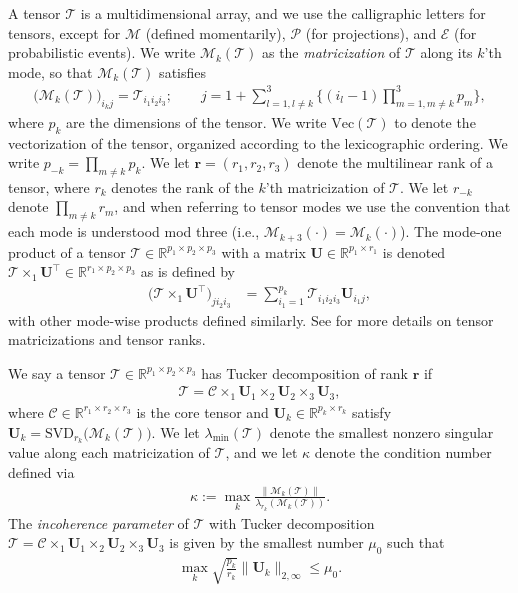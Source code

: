 \documentclass[10pt]{article}
\newcommand{\0}{{\mathbf{0}}}
\newcommand{\1}{{\mathbf{1}}}
\newcommand{\U}{{\mathbf{U}}}
\newcommand{\br}{\boldsymbol{r}}
\renewcommand{\citet}{\cite}
\renewcommand{\t}{^{\top}}
\begin{document}
A tensor $\mathcal{T}$ is a multidimensional array, and we use the calligraphic letters for tensors, except for $\mathcal{M}$ (defined momentarily), $\mathcal{P}$ (for projections), and $\mathcal{E}$ (for probabilistic events).  We write $\mathcal{M}_k(\mathcal{T})$ as the \emph{matricization} of $\mathcal{T}$ along its $k$'th mode, so that $\mathcal{M}_k(\mathcal{T})$ satisfies
\begin{align*}
    \big(\mathcal{M}_k(\mathcal{T}) \big)_{i_kj} = \mathcal{T}_{i_1i_2i_3}; \qquad j = 1 + \sum_{l=1,l\neq k}^{3} \bigg\{ (i_l-1) \prod_{m=1,m\neq k}^3 p_m \bigg\},
\end{align*}
where $p_k$ are the dimensions of the tensor.  We write $\mathrm{Vec}(\mathcal{T})$ to denote the vectorization of the tensor, organized according to the lexicographic ordering.  We write $p_{-k} = \prod_{m\neq k} p_k$.   We let $\br = (r_1,r_2,r_3)$ denote the multilinear rank of a tensor, where $r_k$ denotes the rank of the $k$'th matricization of $\mathcal{T}$.  We let $r_{-k}$ denote $\prod_{m\neq k} r_m$, and when referring to tensor modes we use the convention that each mode is understood mod three (i.e., $\mathcal{M}_{k+3}(\cdot) = \mathcal{M}_k(\cdot)$).  The mode-one  product of a tensor $\mathcal{T}\in\mathbb{R}^{p_1 \times p_2 \times p_3}$ with a matrix $\U\in \mathbb{R}^{p_1 \times r_1}$ is denoted $\mathcal{T} \times_1 \U\t \in \mathbb{R}^{r_1 \times p_2 \times p_3}$ as is defined by
\begin{align*}
    \big( \mathcal{T} \times_1 \U\t \big)_{ji_2i_3} &= \sum_{i_1=1}^{p_k} \mathcal{T}_{i_1i_2i_3} \U_{i_1j},
\end{align*}
with other mode-wise products defined similarly. See \citet{kolda_tensor_2009} for more details on tensor matricizations and tensor ranks.  


We say a tensor $\mathcal{T} \in \mathbb{R}^{p_1 \times p_2 \times p_3}$ has Tucker decomposition of rank  $\br$ if
\begin{align*}
    \mathcal{T} = \mathcal{C} \times_1 \U_1 \times_2 \U_2 \times_3 \U_3,
\end{align*}
where $\mathcal{C}\in \mathbb{R}^{r_1 \times r_2 \times r_3}$ is the core tensor and $\U_k \in \mathbb{R}^{p_k\times r_k}$ satisfy  $\U_k =\mathrm{SVD}_{r_k}\big(\mathcal{M}_k(\mathcal{T})\big)$.   We let $\lambda_{\min}(\mathcal{T})$ denote the smallest nonzero singular value along each  matricization of $\mathcal{T}$, and we let $\kappa$ denote the condition number defined via
\begin{align*}
    \kappa := \max_k \frac{\| \mathcal{M}_k(\mathcal{T})\|}{\lambda_{r_k}(\mathcal{M}_k(\mathcal{T}))}.
\end{align*}
The \emph{incoherence parameter} of $\mathcal{T}$ with Tucker decomposition $\mathcal{T} = \mathcal{C}\times_1 \U_1\times_2 \U_2 \times_3 \U_3$ is given by the smallest number $\mu_0$ such that
\begin{align*}
    \max_k \sqrt{\frac{p_k}{r_k}} \| \U_k \|_{2,\infty} \leq \mu_0.
\end{align*}
\end{document}

